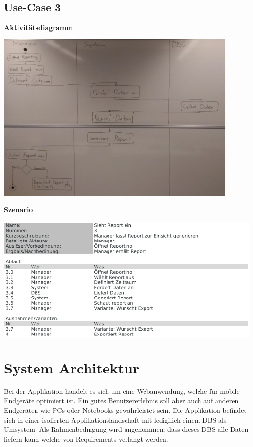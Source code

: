 \documentclass[a4paper]{scrreprt}
\begin{document}
\section{Use-Case 3}

\textbf{Aktivitätsdiagramm}

\includegraphics[width=0.9\textwidth]{uc-3_Report_einsehen/uc3_activity_diagram.png}

\pagebreak

\textbf{Szenario}

\includegraphics[width=1\textwidth]{uc-3_Report_einsehen/uc3_scenario.png}




\chapter{System Architektur}
Bei der Applikation handelt es sich um eine Webanwendung, welche für mobile Endgeräte optimiert ist. Ein gutes Benutzererlebnis soll aber auch auf anderen Endgeräten wie PCs oder Notebooks gewährleistet sein. Die Applikation befindet sich in einer isolierten Applikationslandschaft mit ledigilich einem DBS als Umsystem. Als Rahmenbedingung wird angenommen, dass dieses DBS alle Daten liefern kann welche von Requirements verlangt werden.
\end{document}

